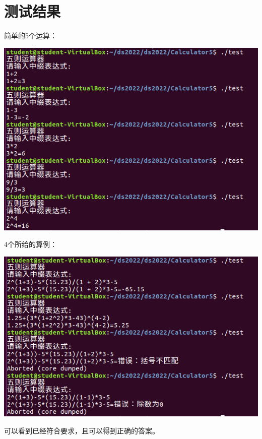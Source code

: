 \documentclass{ctexart}
\begin{document}
\section{测试结果}
简单的5个运算：
\begin{center}
  \includegraphics[scale=0.6]{ss1.png}
  \hspace{0.1in}
\end{center}
4个所给的算例：
\begin{center}
  \includegraphics[scale=0.5]{ss2.png}
  \hspace{0.1in}
\end{center}
可以看到已经符合要求，且可以得到正确的答案。
\end{document}
